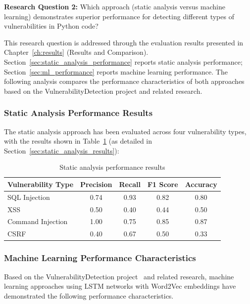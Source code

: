 \textbf{Research Question 2:} Which approach (static analysis versus machine learning) demonstrates superior performance for detecting different types of vulnerabilities in Python code?

This research question is addressed through the evaluation results presented in Chapter~\ref{ch:results} (Results and Comparison). Section~\ref{sec:static_analysis_performance} reports static analysis performance; Section~\ref{sec:ml_performance} reports machine learning performance. The following analysis compares the performance characteristics of both approaches based on the VulnerabilityDetection project and related research.

\subsubsection{Static Analysis Performance Results}
\label{sec:static_perf_results}

The static analysis approach has been evaluated across four vulnerability types, with the results shown in Table~\ref{tab:static_analysis_performance} (as detailed in Section~\ref{sec:static_analysis_results}):

\begin{table}[htbp]
	\centering
	\begin{tabular}{lcccc}
		\textbf{Vulnerability Type} & \textbf{Precision} & \textbf{Recall} & \textbf{F1 Score} & \textbf{Accuracy} \\
		\hline
		SQL Injection & 0.74 & 0.93 & 0.82 & 0.80 \\
		XSS & 0.50 & 0.40 & 0.44 & 0.50 \\
		Command Injection & 1.00 & 0.75 & 0.85 & 0.87 \\
		CSRF & 0.40 & 0.67 & 0.50 & 0.33 \\
	\end{tabular}
	\caption{Static analysis performance results}
	\label{tab:static_analysis_performance}
\end{table}

\subsubsection{Machine Learning Performance Characteristics}
\label{sec:ml_perf_characteristics}

Based on the VulnerabilityDetection project~\cite{VulnDetection} and related research, machine learning approaches using LSTM networks with Word2Vec embeddings have demonstrated the following performance characteristics.

